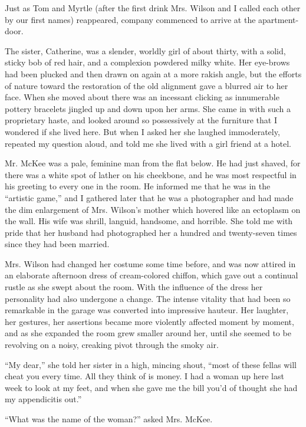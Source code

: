 \documentclass{znotebook}
\begin{document}
Just as Tom and Myrtle (after the first drink Mrs. Wilson and I called each other by our first names) reappeared, company commenced to arrive at the apartment-door.

The sister, Catherine, was a slender, worldly girl of about thirty, with a solid, sticky bob of red hair, and a complexion powdered milky white. Her eye-brows had been plucked and then drawn on again at a more rakish angle, but the efforts of nature toward the restoration of the old alignment gave a blurred air to her face. When she moved about there was an incessant clicking as innumerable pottery bracelets jingled up and down upon her arms. She came in with such a proprietary haste, and looked around so possessively at the furniture that I wondered if she lived here. But when I asked her she laughed immoderately, repeated my question aloud, and told me she lived with a girl friend at a hotel.

Mr. McKee was a pale, feminine man from the flat below. He had just shaved, for there was a white spot of lather on his cheekbone, and he was most respectful in his greeting to every one in the room. He informed me that he was in the ``artistic game,'' and I gathered later that he was a photographer and had made the dim enlargement of Mrs. Wilson’s mother which hovered like an ectoplasm on the wall. His wife was shrill, languid, handsome, and horrible. She told me with pride that her husband had photographed her a hundred and twenty-seven times since they had been married.

Mrs. Wilson had changed her costume some time before, and was now attired in an elaborate afternoon dress of cream-colored chiffon, which gave out a continual rustle as she swept about the room. With the influence of the dress her personality had also undergone a change. The intense vitality that had been so remarkable in the garage was converted into impressive hauteur. Her laughter, her gestures, her assertions became more violently affected moment by moment, and as she expanded the room grew smaller around her, until she seemed to be revolving on a noisy, creaking pivot through the smoky air.

``My dear,'' she told her sister in a high, mincing shout, ``most of these fellas will cheat you every time. All they think of is money. I had a woman up here last week to look at my feet, and when she gave me the bill you’d of thought she had my appendicitis out.''

``What was the name of the woman?'' asked Mrs. McKee.
\end{document}
